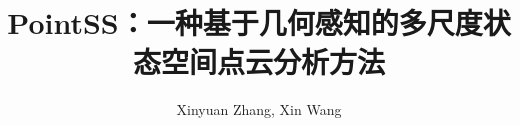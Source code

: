 \documentclass[preprint,12pt]{elsarticle}
\begin{document}
\begin{frontmatter}



\title{PointSS：一种基于几何感知的多尺度状态空间点云分析方法}


\author{Xinyuan Zhang, Xin Wang} %


\begin{abstract}


\end{abstract}
\end{frontmatter}
\end{document}
